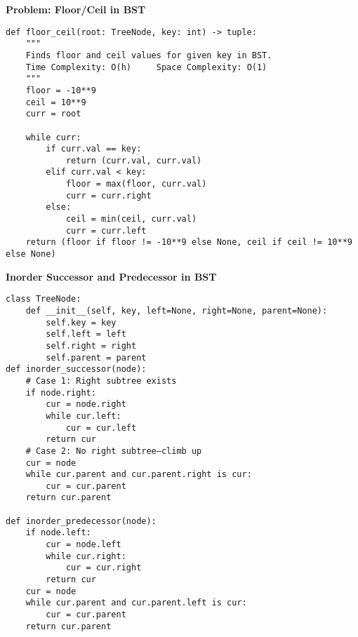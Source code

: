 \noindent\textbf{Problem: Floor/Ceil in BST}
\begin{verbatim}
def floor_ceil(root: TreeNode, key: int) -> tuple:
    """
    Finds floor and ceil values for given key in BST.
    Time Complexity: O(h)     Space Complexity: O(1)
    """
    floor = -10**9
    ceil = 10**9
    curr = root
    
    while curr:
        if curr.val == key:
            return (curr.val, curr.val)
        elif curr.val < key:
            floor = max(floor, curr.val)
            curr = curr.right
        else:
            ceil = min(ceil, curr.val)
            curr = curr.left
    return (floor if floor != -10**9 else None, ceil if ceil != 10**9 else None)
\end{verbatim}
\noindent\textbf{Inorder Successor and Predecessor in BST}
\begin{verbatim}
class TreeNode:
    def __init__(self, key, left=None, right=None, parent=None):
        self.key = key
        self.left = left
        self.right = right
        self.parent = parent
def inorder_successor(node):
    # Case 1: Right subtree exists
    if node.right:
        cur = node.right
        while cur.left:
            cur = cur.left
        return cur
    # Case 2: No right subtree—climb up
    cur = node
    while cur.parent and cur.parent.right is cur:
        cur = cur.parent
    return cur.parent

def inorder_predecessor(node):
    if node.left:
        cur = node.left
        while cur.right:
            cur = cur.right
        return cur
    cur = node
    while cur.parent and cur.parent.left is cur:
        cur = cur.parent
    return cur.parent
\end{verbatim}

